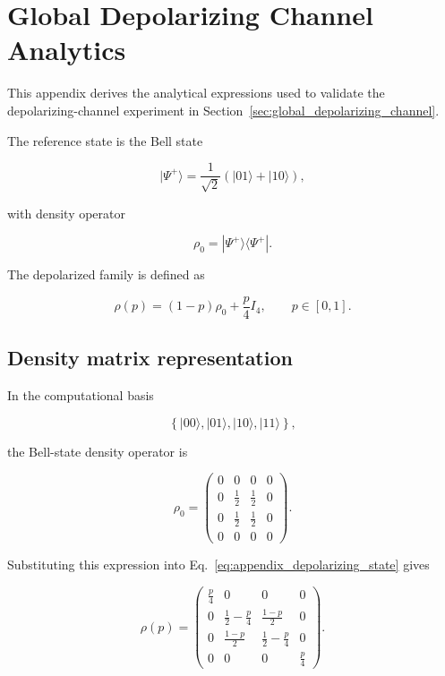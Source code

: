 
\section{Global Depolarizing Channel Analytics}
\label{app:depolarizing_channel_analytics}

This appendix derives the analytical expressions used to validate the depolarizing-channel experiment in Section~\ref{sec:global_depolarizing_channel}.

The reference state is the Bell state

\[
|\Psi^+\rangle
=
\frac{1}{\sqrt{2}}
\left(
|01\rangle + |10\rangle
\right),
\]

with density operator

\[
\rho_0
=
|\Psi^+\rangle
\langle\Psi^+|.
\]

The depolarized family is defined as

\begin{equation}
\rho(p)
=
(1-p)\rho_0
+
\frac{p}{4}I_4,
\qquad
p \in [0,1].
\label{eq:appendix_depolarizing_state}
\end{equation}


\subsection*{Density matrix representation}

In the computational basis

\[
\left\{
|00\rangle,
|01\rangle,
|10\rangle,
|11\rangle
\right\},
\]

the Bell-state density operator is

\[
\rho_0
=
\begin{pmatrix}
0 & 0 & 0 & 0 \\
0 & \frac{1}{2} & \frac{1}{2} & 0 \\
0 & \frac{1}{2} & \frac{1}{2} & 0 \\
0 & 0 & 0 & 0
\end{pmatrix}.
\]

Substituting this expression into Eq.~\eqref{eq:appendix_depolarizing_state} gives

\[
\rho(p)
=
\begin{pmatrix}
\frac{p}{4} & 0 & 0 & 0 \\
0 & \frac{1}{2}-\frac{p}{4} & \frac{1-p}{2} & 0 \\
0 & \frac{1-p}{2} & \frac{1}{2}-\frac{p}{4} & 0 \\
0 & 0 & 0 & \frac{p}{4}
\end{pmatrix}.
\]

